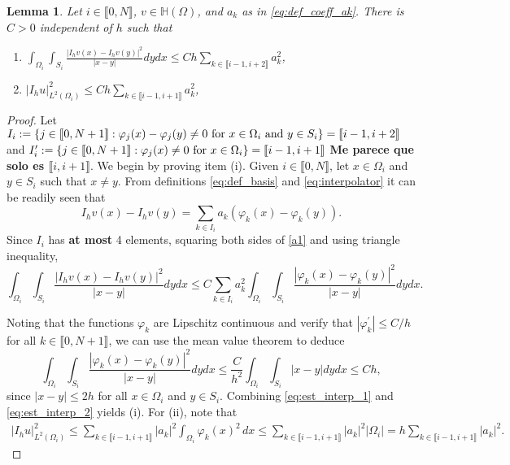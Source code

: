 \documentclass[11 pt]{article}
\newcommand\blue[1]{{\color{blue}\textbf{#1}}}
\newcommand\inter[1]{\llbracket #1\rrbracket}
\newtheorem{lemma}[theorem]{Lemma}
\numberwithin{equation}{section}
\begin{document}
\begin{lemma}\label{lem:loc_norm_interp}
Let $i\in\inter{0,N}$, $v\in \mathbb H(\Omega)$, and $a_k$ as in \eqref{eq:def_coeff_ak}.  There is $C>0$ independent of $h$ such that
%
\begin{enumerate}[label=\upshape(\roman*)]
\item $\displaystyle \int_{\Omega_i}\int_{S_i}\frac{|I_hv(x)-I_hv(y)|^2}{|x-y|}dy dx\leq Ch\sum_{k\in \inter{i-1,i+2}} a_k^2$,
\item  $\displaystyle |I_h u|^2_{L^2(\Omega_i)}\leq Ch\sum_{k\in \inter{i-1,i+1}} a_k^2$,
\end{enumerate}
\end{lemma}
\begin{proof}
Let $I_i:=\{j\in\inter{0,N+1}:\varphi_j(x)-\varphi_j(y) \neq 0 \ \textnormal{for $x\in \Omega_i$ and $y\in S_i$}\}=\inter{i-1,i+2}$ and  $I^\prime_i:=\{j\in\inter{0,N+1}:\varphi_j(x)\neq 0 \ \textnormal{for $x\in \Omega_i$}\}=\inter{i-1,i+1}$ \blue{Me parece que solo es $\inter{i,i+1}$}. We begin by proving item (i). Given $i\in\inter{0,N}$, let $x\in \Omega_i$ and $y\in S_i$ such that $x\neq y$.  From definitions \eqref{eq:def_basis} and \eqref{eq:interpolator} it can be readily seen that
%
\begin{equation}\label{a1}
    I_hv(x)-I_hv(y)=\sum_{k\in I_i} a_k(\varphi_k(x)-\varphi_k(y)).
\end{equation}
%
Since $I_i$ has \blue{at most} 4 elements, squaring both sides of \eqref{a1} and using triangle inequality,
%
\begin{equation}\label{eq:est_interp_1}
    \int_{\Omega_i}\int_{S_i}\frac{|I_hv(x)- I_hv(y)|^2}{|x-y|} dy dx \leq C \sum_{k\in I_i} a_k^2\int_{\Omega_i}\int_{S_i} \frac{|\varphi_k(x)- \varphi_k(y)|^2}{|x-y|} dy dx.
\end{equation}
%

Noting that the functions $\varphi_k$ are Lipschitz continuous and verify that $|\varphi_k^\prime|\leq C/h$ for all $k\in\inter{0,N+1}$, we can use the mean value theorem to deduce
%
\begin{equation}\label{eq:est_interp_2}
    \int_{\Omega_i}\int_{S_i}\frac{|\varphi_k(x)-\varphi_k(y)|^2}{|x-y|}dy dx \leq \frac{C}{h^2}\int_{\Omega_i}\int_{S_i}|x-y|dy dx \leq Ch,
\end{equation}
%
since $|x-y|\leq 2h$ for all $x\in \Omega_i$ and $y\in S_i$. Combining \eqref{eq:est_interp_1} and \eqref{eq:est_interp_2} yields (i). For (ii), note that
\begin{align*}
|I_h u|^2_{L^2(\Omega_i)}
\leq \sum_{k\in \inter{i-1,i+1}}|a_k|^2\int_{\Omega_i}\varphi_k(x)^2\, dx
\leq \sum_{k\in \inter{i-1,i+1}}|a_k|^2|\Omega_i|=h\sum_{k\in \inter{i-1,i+1}}|a_k|^2.
\end{align*}
%
\end{proof}
\end{document}
